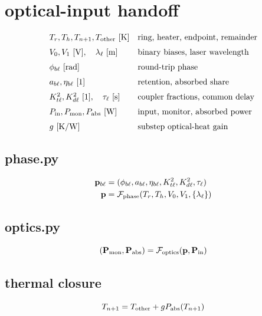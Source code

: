 \section*{optical-input handoff}
\[
\begin{array}{ll}T_r,T_h,T_{n+1},T_{\rm other}\ [\mathrm K]&\text{ring, heater, endpoint, remainder}\\[0.6em]V_0,V_1\ [\mathrm V],\quad\lambda_\ell\ [\mathrm m]&\text{binary biases, laser wavelength}\\[0.6em]\phi_{b\ell}\ [\mathrm{rad}]&\text{round-trip phase}\\[0.6em]a_{b\ell},\eta_{b\ell}\ [1]&\text{retention, absorbed share}\\[0.6em]K_{t\ell}^2,K_{d\ell}^2\ [1],\quad\tau_\ell\ [\mathrm s]&\text{coupler fractions, common delay}\\[0.6em]P_{\rm in},P_{\rm mon},P_{\rm abs}\ [\mathrm W]&\text{input, monitor, absorbed power}\\[0.6em]g\ [\mathrm{K/W}]&\text{substep optical-heat gain}\end{array}
\]
\subsection*{phase.py}
\[
\displaystyle \begin{aligned}\mathbf p_{b\ell}&=(\phi_{b\ell},a_{b\ell},\eta_{b\ell},K_{t\ell}^2,K_{d\ell}^2,\tau_\ell)\\\mathbf p&=\mathcal F_{\rm phase}(T_r,T_h,V_0,V_1,\{\lambda_\ell\})\end{aligned}
\]
\subsection*{optics.py}
\[
\displaystyle (\mathbf P_{\rm mon},\mathbf P_{\rm abs})=\mathcal F_{\rm optics}(\mathbf p,\mathbf P_{\rm in})
\]
\subsection*{thermal closure}
\[
\displaystyle T_{n+1}=T_{\rm other}+gP_{\rm abs}(T_{n+1})
\]
